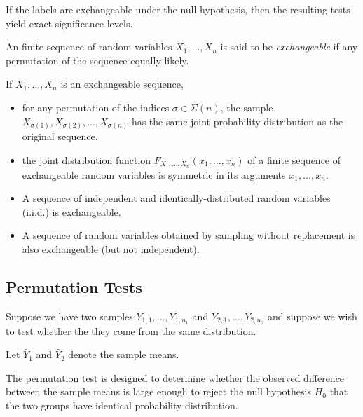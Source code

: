 If the labels are exchangeable under the null hypothesis, then the resulting tests yield exact significance levels.

\begin{definition}
An finite sequence of random variables $X_1,\ldots,X_n$ is said to be \emph{exchangeable} if any permutation of the sequence equally likely. 
\end{definition}

If $X_1,\ldots,X_n$ is an exchangeable sequence,
\begin{itemize}
\item 
for any permutation of the indices $\sigma\in\Sigma(n)$, the sample $X_{\sigma(1)}, X_{\sigma(2)},\ldots,X_{\sigma(n)}$ has the same joint probability distribution as the original sequence.
\item
the joint distribution function $F_{X_1,\ldots,X_n}(x_1,\ldots,x_n)$ of a finite sequence of exchangeable random variables is symmetric in its arguments $x_1,\ldots,x_n$.
\item
A sequence of independent and identically-distributed random variables (i.i.d.) is exchangeable.
\item
A sequence of random variables obtained by sampling without replacement is also exchangeable (but not independent).
\end{itemize}

\subsection{Permutation Tests}
Suppose we have two samples $Y_{1,1},\ldots,Y_{1,n_1}$ and $Y_{2,1},\ldots,Y_{2,n_2}$ and suppose we wish to test whether the they come from the same distribution.

Let $\bar{Y}_1$ and $\bar{Y}_2$ denote the sample means.

The permutation test is designed to determine whether the observed difference between the sample means is large enough to reject the null hypothesis $H_0$ that the two groups have identical probability distribution.

